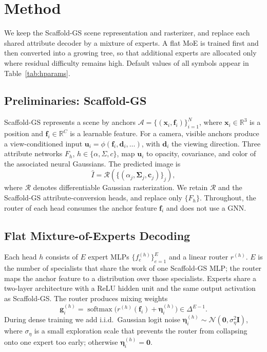 \section{Method}
\label{sec:method}

We keep the Scaffold-GS scene representation and rasterizer, and replace each shared attribute decoder by a mixture of experts.
A flat MoE is trained first and then converted into a growing tree, so that additional experts are allocated only where residual difficulty remains high.
Default values of all symbols appear in Table~\ref{tab:hparams}.

\subsection{Preliminaries: Scaffold-GS}
\label{sec:prelim}

Scaffold-GS represents a scene by anchors $\mathcal{A}=\{(\mathbf{x}_i,\mathbf{f}_i)\}_{i=1}^{N}$,
where $\mathbf{x}_i\in\mathbb{R}^{3}$ is a position and $\mathbf{f}_i\in\mathbb{R}^{C}$ is a learnable feature.
For a camera, visible anchors produce a view-conditioned input $\mathbf{u}_i=\phi(\mathbf{f}_i,\mathbf{d}_i,\ldots)$,
with $\mathbf{d}_i$ the viewing direction.
Three attribute networks $F_h$, $h\in\{\alpha,\Sigma,c\}$, map $\mathbf{u}_i$ to opacity, covariance, and color of the associated neural Gaussians.
The predicted image is
\begin{equation}
\hat{I}
=
\mathcal{R}\!\left(
\big\{(\alpha_j,\boldsymbol{\Sigma}_j,\mathbf{c}_j)\big\}_{j}
\right),
\label{eq:render}
\end{equation}
where $\mathcal{R}$ denotes differentiable Gaussian rasterization.
We retain $\mathcal{R}$ and the Scaffold-GS attribute-conversion heads, and replace only $\{F_h\}$.
Throughout, the router of each head consumes the anchor feature $\mathbf{f}_i$ and does not use a GNN.

\subsection{Flat Mixture-of-Experts Decoding}
\label{sec:flat}

Each head $h$ consists of $E$ expert MLPs $\{f_e^{(h)}\}_{e=1}^{E}$ and a linear router $r^{(h)}$.
$E$ is the number of specialists that share the work of one Scaffold-GS MLP;
the router maps the anchor feature to a distribution over those specialists.
Experts share a two-layer architecture with a ReLU hidden unit and the same output activation as Scaffold-GS.
The router produces mixing weights
\begin{equation}
\mathbf{g}_i^{(h)}
=
\operatorname{softmax}\!\big(
r^{(h)}(\mathbf{f}_i)+\boldsymbol{\eta}_i^{(h)}
\big)
\in\Delta^{E-1}.
\label{eq:flat-gates}
\end{equation}
During dense training we add i.i.d.\ Gaussian logit noise $\boldsymbol{\eta}_i^{(h)}\sim\mathcal{N}(\mathbf{0},\sigma_{\eta}^{2}\mathbf{I})$,
where $\sigma_{\eta}$ is a small exploration scale that prevents the router from collapsing onto one expert too early;
otherwise $\boldsymbol{\eta}_i^{(h)}=\mathbf{0}$.

